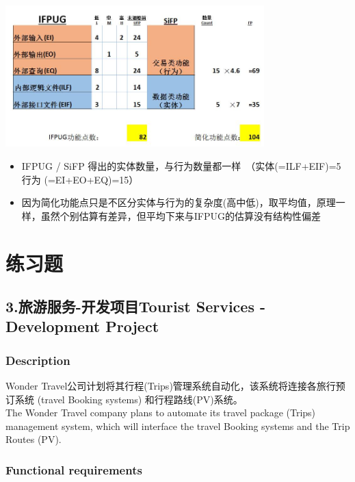 
\includegraphics[width=10cm]{FPAS11.jpg}

\begin{itemize}
\tightlist
\item
  IFPUG / SiFP
  得出的实体数量，与行为数量都一样　（实体(=ILF+EIF)=5　　行为
  (=EI+EO+EQ)=15）
\item
  因为简化功能点只是不区分实体与行为的复杂度(高中低)，取平均值，原理一样，虽然个别估算有差异，但平均下来与IFPUG的估算没有结构性偏差
\end{itemize}

\hypertarget{ux7ec3ux4e60ux9898}{%
\section{练习题}\label{ux7ec3ux4e60ux9898}}

\hypertarget{ux65c5ux6e38ux670dux52a1-ux5f00ux53d1ux9879ux76eetourist-services---development-project}{%
\subsection{3.旅游服务-开发项目Tourist Services - Development
Project}\label{ux65c5ux6e38ux670dux52a1-ux5f00ux53d1ux9879ux76eetourist-services---development-project}}

\hypertarget{description}{%
\subsubsection{Description}\label{description}}

Wonder
Travel公司计划将其行程(Trips)管理系统自动化，该系统将连接各旅行预订系统
(travel Booking systems) 和行程路线(PV)系统。\\
The Wonder Travel company plans to automate its travel package (Trips)
management system, which will interface the travel Booking systems and
the Trip Routes (PV).

\hypertarget{functional-requirements}{%
\subsubsection{Functional requirements}\label{functional-requirements}}

